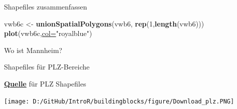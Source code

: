 \documentclass[ignorenonframetext,]{beamer}
\newenvironment{Shaded}{\begin{snugshade}}{\end{snugshade}}
\newcommand{\DataTypeTok}[1]{\textcolor[rgb]{0.74,0.68,0.62}{\underline{#1}}}
\newcommand{\DecValTok}[1]{\textcolor[rgb]{0.27,0.67,0.26}{#1}}
\newcommand{\KeywordTok}[1]{\textcolor[rgb]{0.26,0.66,0.93}{\textbf{#1}}}
\newcommand{\NormalTok}[1]{\textcolor[rgb]{0.74,0.68,0.62}{#1}}
\newcommand{\OperatorTok}[1]{\textcolor[rgb]{0.74,0.68,0.62}{#1}}
\newcommand{\StringTok}[1]{\textcolor[rgb]{0.02,0.61,0.04}{#1}}
\begin{document}
\begin{frame}[fragile]{Shapefiles zusammenfassen}
\protect\hypertarget{shapefiles-zusammenfassen}{}

\begin{Shaded}
\begin{Highlighting}[]
\NormalTok{vwb6c <-}\StringTok{ }\KeywordTok{unionSpatialPolygons}\NormalTok{(vwb6,}
              \KeywordTok{rep}\NormalTok{(}\DecValTok{1}\NormalTok{,}\KeywordTok{length}\NormalTok{(vwb6)))}
\KeywordTok{plot}\NormalTok{(vwb6c,}\DataTypeTok{col=}\StringTok{"royalblue"}\NormalTok{)}
\end{Highlighting}
\end{Shaded}

\end{frame}

\begin{frame}[fragile]{Wo ist Mannheim?}
\protect\hypertarget{wo-ist-mannheim}{}

\begin{Shaded}
\end{Shaded}

\end{frame}

\begin{frame}{Shapefiles für PLZ-Bereiche}
\protect\hypertarget{shapefiles-fur-plz-bereiche}{}

\begin{block}{\href{http://arnulf.us/PLZ}{\textbf{Quelle}} für PLZ
Shapefiles}

\texttt{[image: D:/GitHub/IntroR/buildingblocks/figure/Download\_plz.PNG]}

\end{block}

\end{frame}
\end{document}
